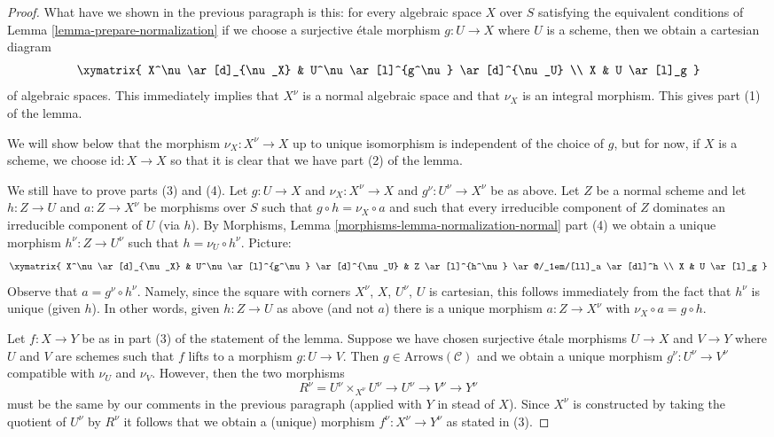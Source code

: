 \documentclass{stacks-project}
\theoremstyle{plain}
\theoremstyle{definition}
\theoremstyle{remark}
\numberwithin{equation}{subsection}
\begin{document}
\begin{proof}
\medskip\noindent
What have we shown in the previous paragraph is this: for every algebraic
space $X$ over $S$ satisfying the equivalent conditions of
Lemma \ref{lemma-prepare-normalization} if we choose a surjective \'etale
morphism $g : U \to X$ where $U$ is a scheme, then we obtain
a cartesian diagram
$$
\xymatrix{
X^\nu \ar[d]_{\nu_X} & U^\nu \ar[l]^{g^\nu} \ar[d]^{\nu_U} \\
X & U \ar[l]_g
}
$$
of algebraic spaces. This immediately implies that $X^\nu$ is a normal
algebraic space and that $\nu_X$ is an integral morphism. This gives
part (1) of the lemma.

\medskip\noindent
We will show below that the morphism $\nu_X : X^\nu \to X$
up to unique isomorphism is independent of the choice of $g$,
but for now, if $X$ is a scheme, we choose $\text{id} : X \to X$
so that it is clear that we have part (2) of the lemma.

\medskip\noindent
We still have to prove parts (3) and (4). Let $g : U \to X$ and
$\nu_X : X^\nu \to X$ and $g^\nu : U^\nu \to X^\nu$ be as above.
Let $Z$ be a normal scheme and let $h : Z \to U$ and $a : Z \to X^\nu$
be morphisms over $S$ such that $g \circ h = \nu_X \circ a$ and such that
every irreducible component of $Z$ dominates an irreducible component of $U$
(via $h$). By
Morphisms, Lemma \ref{morphisms-lemma-normalization-normal} part (4)
we obtain a unique morphism $h^\nu : Z \to U^\nu$ such
that $h = \nu_U \circ h^\nu$. Picture:
$$
\xymatrix{
X^\nu \ar[d]_{\nu_X} &
U^\nu \ar[l]^{g^\nu} \ar[d]^{\nu_U} &
Z \ar[l]^{h^\nu} \ar@/_1em/[ll]_a \ar[dl]^h
\\
X & U \ar[l]_g
}
$$
Observe that $a = g^\nu \circ h^\nu$. Namely, since the square with
corners $X^\nu$, $X$, $U^\nu$, $U$ is cartesian, this follows
immediately from the fact that $h^\nu$ is unique (given $h$).
In other words, given $h : Z \to U$ as above (and not $a$)
there is a unique morphism $a : Z \to X^\nu$ with
$\nu_X \circ a = g \circ h$.

\medskip\noindent
Let $f : X \to Y$ be as in part (3) of the statement of the lemma.
Suppose we have chosen surjective \'etale morphisms $U \to X$ and
$V \to Y$ where $U$ and $V$ are schemes such that $f$ lifts to a
morphism $g : U \to V$. Then $g \in \text{Arrows}(\mathcal{C})$
and we obtain a unique morphism $g^\nu : U^\nu \to V^\nu$ compatible
with $\nu_U$ and $\nu_V$. However, then the two morphisms
$$
R^\nu = U^\nu \times_{X^\nu} U^\nu
\to U^\nu \to V^\nu \to Y^\nu
$$
must be the same by our comments in the previous paragraph (applied
with $Y$ in stead of $X$).
Since $X^\nu$ is constructed by taking the quotient of
$U^\nu$ by $R^\nu$ it follows that we obtain a (unique)
morphism $f^\nu : X^\nu \to Y^\nu$ as stated in (3).


\end{proof}
\end{document}
